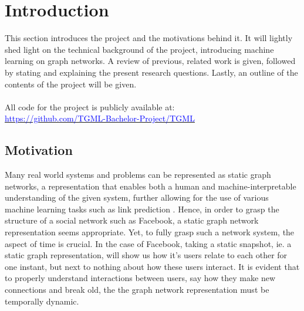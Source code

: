 \section{Introduction}
\label{sec:Intro}

This section introduces the project and the motivations behind it.
It will lightly shed light on the technical background of the project, introducing machine learning on graph networks.
A review of previous, related work is given, followed by stating and explaining the present research questions.
Lastly, an outline of the contents of the project will be given.
\\\\
All code for the project is publicly available at:
\\
\href{https://github.com/TGML-Bachelor-Project/TGML}{\textcolor{blue}{https://github.com/TGML-Bachelor-Project/TGML}}


\subsection{Motivation}
\label{sec:Intro:Motivation}
Many real world systems and problems can be represented as static graph networks, a representation that enables both a human and machine-interpretable understanding of the given system, further allowing for the use of various machine learning tasks such as link prediction 
.
Hence, in order to grasp the structure of a social network such as Facebook, a static graph network representation seems appropriate.
Yet, to fully grasp such a network system, the aspect of time is crucial.
In the case of Facebook, taking a static snapshot, ie. a static graph representation, will show us how it's users relate to each other for one instant, but next to nothing about how these users interact.
It is evident that to properly understand interactions between users, say how they make new connections and break old, the the graph network representation must be temporally dynamic.

